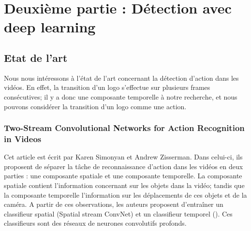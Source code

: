 \documentclass[11pt]{article}
\begin{document}
\section{Deuxième partie : Détection avec deep learning}
\label{sec-8}

\subsection{Etat de l'art}
\label{sec-8-1}
Nous nous intéressons à l'état de l'art concernant la détection d'action
dans les vidéos. En effet, la transition d'un logo s'effectue sur plusieurs 
frames consécutives; il y a donc une composante temporelle à notre recherche,
et nous pouvons considérer la transition d'un logo comme une action.
\subsubsection{Two-Stream Convolutional Networks for Action Recognition in Videos}
\label{sec-8-1-1}
Cet article est écrit par Karen Simonyan et Andrew Zisserman. Dans celui-ci,
ils proposent de séparer la tâche de reconnaissance d'action dans les vidéos en 
deux parties : une composante spatiale et une composante temporelle.
La composante spatiale contient l'information concernant sur les objets dans
la vidéo; tandis que la composante temporelle l'information sur les 
déplacements de ces objets et de la caméra. 
A partir de ces observations, les auteurs proposent d'entraîner un classifieur
spatial (Spatial stream ConvNet) et un classifieur temporel (). Ces classifieurs
sont des réseaux de neurones convolutifs profonds. 
\end{document}
